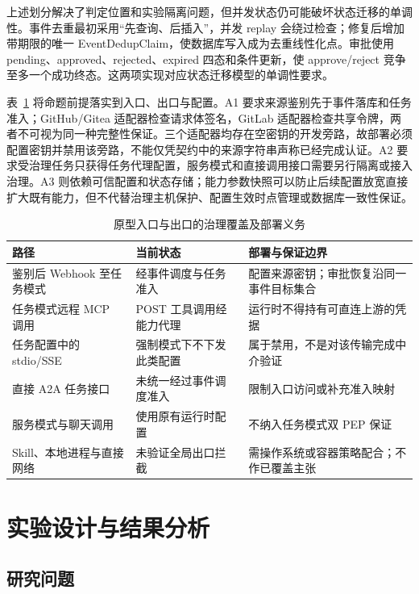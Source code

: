 上述划分解决了判定位置和实验隔离问题，但并发状态仍可能破坏状态迁移的单调性。事件去重最初采用“先查询、后插入”，并发 replay 会绕过检查；修复后增加带期限的唯一 EventDedupClaim，使数据库写入成为去重线性化点。审批使用 pending、approved、rejected、expired 四态和条件更新，使 approve/reject 竞争至多一个成功终态。这两项实现对应状态迁移模型的单调性要求。

表~\ref{tab:entry-exit-rr022} 将命题前提落实到入口、出口与配置。A1 要求来源鉴别先于事件落库和任务准入；GitHub/Gitea 适配器检查请求体签名，GitLab 适配器检查共享令牌，两者不可视为同一种完整性保证。三个适配器均存在空密钥的开发旁路，故部署必须配置密钥并禁用该旁路，不能仅凭契约中的来源字符串声称已经完成认证。A2 要求受治理任务只获得任务代理配置，服务模式和直接调用接口需要另行隔离或接入治理。A3 则依赖可信配置和状态存储；能力参数快照可以防止后续配置放宽直接扩大既有能力，但不代替治理主机保护、配置生效时点管理或数据库一致性保证。

\begin{table}[htbp]
\centering
\caption{原型入口与出口的治理覆盖及部署义务}
\label{tab:entry-exit-rr022}
\small
\begin{tabular}{p{37mm}p{44mm}p{56mm}}
\toprule
路径 & 当前状态 & 部署与保证边界 \\
\midrule
鉴别后 Webhook 至任务模式 & 经事件调度与任务准入 & 配置来源密钥；审批恢复沿同一事件目标集合 \\
任务模式远程 MCP 调用 & POST 工具调用经能力代理 & 运行时不得持有可直连上游的凭据 \\
任务配置中的 stdio/SSE & 强制模式下不下发此类配置 & 属于禁用，不是对该传输完成中介验证 \\
直接 A2A 任务接口 & 未统一经过事件调度准入 & 限制入口访问或补充准入映射 \\
服务模式与聊天调用 & 使用原有运行时配置 & 不纳入任务模式双 PEP 保证 \\
Skill、本地进程与直接网络 & 未验证全局出口拦截 & 需操作系统或容器策略配合；不作已覆盖主张 \\
\bottomrule
\end{tabular}
\end{table}

\section{实验设计与结果分析}\label{sec:evaluation-v11}

\subsection{研究问题}

